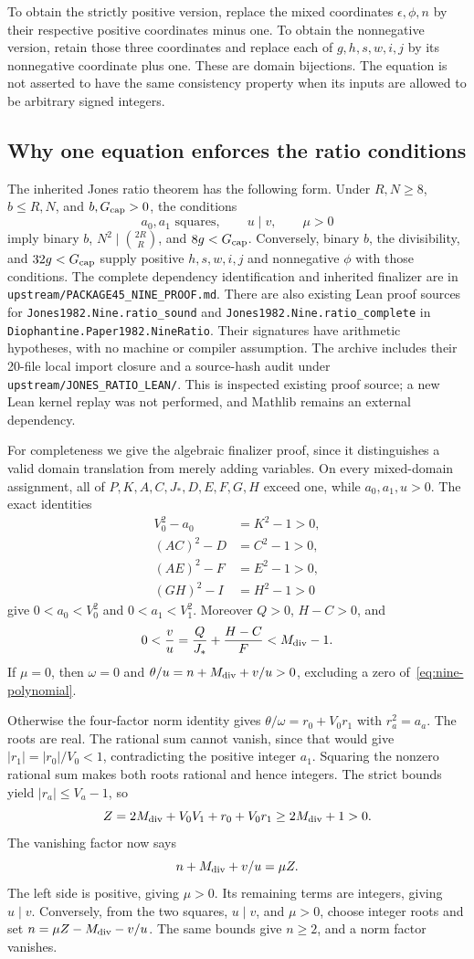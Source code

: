 \documentclass[11pt,letterpaper]{article}
\theoremstyle{remark}\newtheorem{remark}[theorem]{Remark}
\newcommand{\file}[1]{\nolinkurl{#1}}
\begin{document}
To obtain the strictly positive version, replace the mixed coordinates
$\epsilon,\phi,n$ by their respective positive coordinates minus one.
To obtain the nonnegative version, retain those three coordinates and
replace each of $g,h,s,w,i,j$ by its nonnegative coordinate plus one.
These are domain bijections. The equation is not asserted to have the
same consistency property when its inputs are allowed to be arbitrary
signed integers.

\subsection{Why one equation enforces the ratio conditions}
The inherited Jones ratio theorem has the following form.
Under $R,N\ge8$, $b\le R,N$, and $b,G_{\rm cap}>0$, the conditions
\[
 a_0,a_1\text{ squares},\qquad u\mid v,\qquad\mu>0
\]
imply binary $b$, $N^2\mid\binom{2R}{R}$, and $8g<G_{\rm cap}$.
Conversely, binary $b$, the divisibility, and $32g<G_{\rm cap}$
supply positive $h,s,w,i,j$ and nonnegative $\phi$ with those conditions.
The complete dependency identification and inherited finalizer are in
\file{upstream/PACKAGE45_NINE_PROOF.md}.
There are also existing Lean proof sources for
\file{Jones1982.Nine.ratio_sound} and
\file{Jones1982.Nine.ratio_complete} in
\file{Diophantine.Paper1982.NineRatio}.
Their signatures have arithmetic hypotheses, with no machine or compiler
assumption. The archive includes their 20-file local import closure and
a source-hash audit under \file{upstream/JONES_RATIO_LEAN/}.
This is inspected existing proof source; a new Lean kernel replay was
not performed, and Mathlib remains an external dependency.

For completeness we give the algebraic finalizer proof, since it
distinguishes a valid domain translation from merely adding variables.
On every mixed-domain assignment, all of $P,K,A,C,J_*,D,E,F,G,H$ exceed
one, while $a_0,a_1,u>0$. The exact identities
\begin{align*}
 V_0^2-a_0&=K^2-1>0,\\
 (AC)^2-D&=C^2-1>0,\\
 (AE)^2-F&=E^2-1>0,\\
 (GH)^2-I&=H^2-1>0
\end{align*}
give $0<a_0<V_0^2$ and $0<a_1<V_1^2$.
Moreover $Q>0$, $H-C>0$, and
\[
 0<\frac vu=\frac Q{J_*}+\frac{H-C}{F}<M_{\rm div}-1.
\]
If $\mu=0$, then $\omega=0$ and
$\theta/u=n+M_{\rm div}+v/u>0$, excluding a zero of~\eqref{eq:nine-polynomial}.

Otherwise the four-factor norm identity gives
$\theta/\omega=r_0+V_0r_1$ with $r_a^2=a_a$.
The roots are real. The rational sum cannot vanish, since that would
give $|r_1|=|r_0|/V_0<1$, contradicting the positive integer $a_1$.
Squaring the nonzero rational sum makes both roots rational and hence
integers. The strict bounds yield $|r_a|\le V_a-1$, so
\[
 Z=2M_{\rm div}+V_0V_1+r_0+V_0r_1\ge2M_{\rm div}+1>0.
\]
The vanishing factor now says
\[
 n+M_{\rm div}+v/u=\mu Z.
\]
The left side is positive, giving $\mu>0$.
Its remaining terms are integers, giving $u\mid v$.
Conversely, from the two squares, $u\mid v$, and $\mu>0$, choose integer
roots and set $n=\mu Z-M_{\rm div}-v/u$. The same bounds give $n\ge2$,
and a norm factor vanishes.
\end{document}
